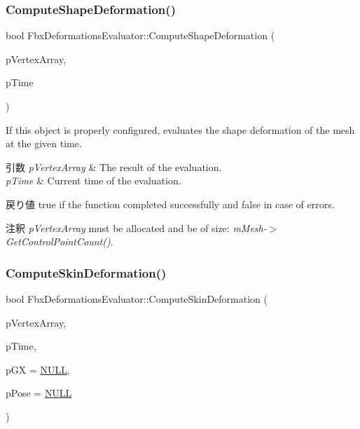 \subsubsection{\texorpdfstring{Compute\+Shape\+Deformation()}{ComputeShapeDeformation()}}
{\footnotesize\ttfamily bool Fbx\+Deformations\+Evaluator\+::\+Compute\+Shape\+Deformation (\begin{DoxyParamCaption}\item[{\hyperlink{class_fbx_vector4}{Fbx\+Vector4} $\ast$}]{p\+Vertex\+Array,  }\item[{const \hyperlink{class_fbx_time}{Fbx\+Time} \&}]{p\+Time }\end{DoxyParamCaption})}

If this object is properly configured, evaluates the shape deformation of the mesh at the given time. 
\begin{DoxyParams}{引数}
{\em p\+Vertex\+Array} & The result of the evaluation. \\
\hline
{\em p\+Time} & Current time of the evaluation. \\
\hline
\end{DoxyParams}
\begin{DoxyReturn}{戻り値}
{\ttfamily true} if the function completed successfully and {\ttfamily false} in case of errors. 
\end{DoxyReturn}
\begin{DoxyRemark}{注釈}
{\itshape p\+Vertex\+Array} must be allocated and be of size\+: {\itshape m\+Mesh-\/$>$Get\+Control\+Point\+Count()}. 
\end{DoxyRemark}
\mbox{\label{class_fbx_deformations_evaluator_a0bd5a2a85b36ff78be4739de7cc9918e}} 
\subsubsection{\texorpdfstring{Compute\+Skin\+Deformation()}{ComputeSkinDeformation()}}
{\footnotesize\ttfamily bool Fbx\+Deformations\+Evaluator\+::\+Compute\+Skin\+Deformation (\begin{DoxyParamCaption}\item[{\hyperlink{class_fbx_vector4}{Fbx\+Vector4} $\ast$}]{p\+Vertex\+Array,  }\item[{const \hyperlink{class_fbx_time}{Fbx\+Time} \&}]{p\+Time,  }\item[{\hyperlink{class_fbx_a_matrix}{Fbx\+A\+Matrix} $\ast$}]{p\+GX = {\ttfamily \hyperlink{fbxarch_8h_a070d2ce7b6bb7e5c05602aa8c308d0c4}{N\+U\+LL}},  }\item[{const \hyperlink{class_fbx_pose}{Fbx\+Pose} $\ast$}]{p\+Pose = {\ttfamily \hyperlink{fbxarch_8h_a070d2ce7b6bb7e5c05602aa8c308d0c4}{N\+U\+LL}} }\end{DoxyParamCaption})}

